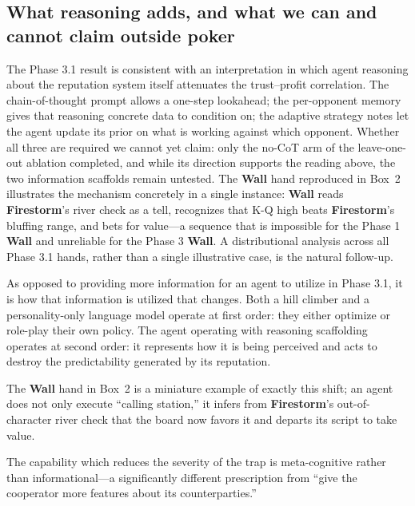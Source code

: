 \documentclass[10pt,twocolumn,letterpaper]{article}
\newcommand{\arch}[1]{\textbf{#1}}
\begin{document}
\subsection{What reasoning adds, and what we can and cannot claim
outside poker}
The Phase 3.1 result is consistent with an interpretation in
which agent reasoning about the reputation system itself
attenuates the trust--profit correlation. The chain-of-thought
prompt allows a one-step lookahead; the per-opponent memory
gives that reasoning concrete data to condition on; the
adaptive strategy notes let the agent update its prior on what
is working against which opponent. Whether all three are required we
cannot yet claim: only the no-CoT arm of the leave-one-out ablation
completed, and while its direction supports the reading above, the two
information scaffolds remain untested. The \arch{Wall} hand reproduced in Box~2
illustrates the mechanism concretely in a single instance:
\arch{Wall} reads \arch{Firestorm}'s river check as a tell,
recognizes that K-Q high beats \arch{Firestorm}'s bluffing
range, and bets for value---a sequence that is impossible for
the Phase 1 \arch{Wall} and unreliable for the Phase 3
\arch{Wall}. A distributional analysis across all Phase 3.1
hands, rather than a single illustrative case, is the natural
follow-up.

As opposed to providing more information for an agent to utilize in
Phase 3.1, it is how that information is utilized that changes. Both a hill
climber and a personality-only language model operate at first order: they
either optimize or role-play their own policy. The agent operating with
reasoning scaffolding operates at second order: it represents how it is being
perceived and acts to destroy the predictability generated by its reputation.

The \arch{Wall} hand in Box~2 is a miniature example of exactly this shift;
an agent does not only execute ``calling station,'' it infers from
\arch{Firestorm}'s out-of-character river check that the board now favors it and
departs its script to take value.

The capability which reduces the severity of the trap is meta-cognitive
rather than informational---a significantly different prescription from ``give
the cooperator more features about its counterparties.''
\end{document}
